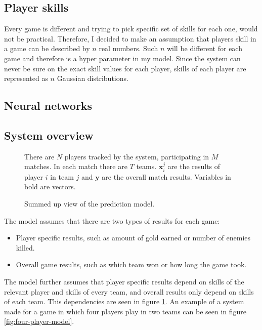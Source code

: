 \documentclass[12pt,a4paper]{book}
\newcommand\bs[1]{\boldsymbol{#1}}
\newcommand\note[1]{\vspace*{-0.5\baselineskip}\caption*{#1}}
\begin{document}
\subsection{Player skills}
Every game is different and trying to pick specific set of skills for each one, would not be practical.
Therefore, I decided to make an assumption that players skill in a game can be described by $n$ real numbers.
Such $n$ will be different for each game and therefore is a hyper parameter in my model.
Since the system can never be sure on the exact skill values for each player, skills of each player are represented as $n$ Gaussian distributions.
\subsection{Neural networks}

\subsection{System overview}
\begin{figure}[ht]
\centering
{}
\caption{Summed up view of the prediction model.}
\note{There are $N$ players tracked by the system, participating in $M$ matches.
In each match there are $T$ teams.
$\bs{x}_i^j$ are the results of player $i$ in team $j$ and $\bs{y}$ are the overall match results.
Variables in bold are vectors.}
\label{fig:model-simple}
\end{figure}
The model assumes that there are two types of results for each game:
\begin{itemize}
\item Player specific results, such as amount of gold earned or number of enemies killed.
\item Overall game results, such as which team won or how long the game took.
\end{itemize}
The model further assumes that player specific results depend on skills of the relevant player and skills of every team, and overall results only depend on skills of each team.
This dependencies are seen in figure \ref{fig:model-simple}.
An example of a system made for a game in which four players play in two teams can be seen in figure \ref{fig:four-player-model}.
\end{document}
